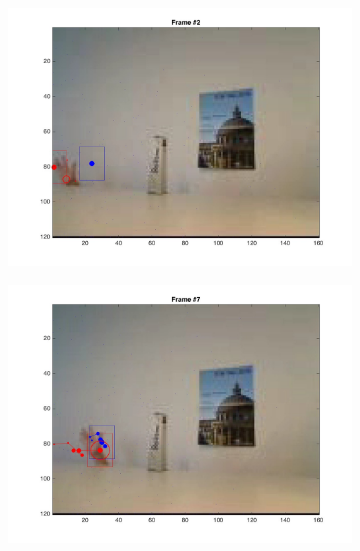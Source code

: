 \documentclass{ethz_report}
\begin{document}
\begin{figure}[h]
    \centering
    \begin{subfigure}[b]{.25\textwidth}
        \centering
        \includegraphics[width=1\linewidth]{images/video2_noise_high_1}
    \end{subfigure}%
    \begin{subfigure}[b]{.25\textwidth}
        \centering
        \includegraphics[width=1\linewidth]{images/video2_noise_high_6}
    \end{subfigure}%
    \begin{subfigure}[b]{.25\textwidth}
        \centering

\end{subfigure}
\end{figure}
\end{document}
